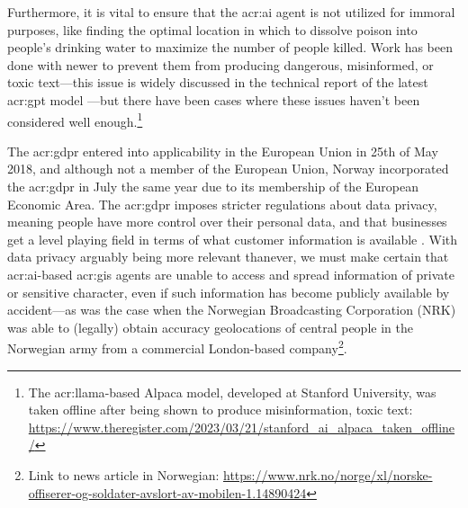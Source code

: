 Furthermore, it is vital to ensure that the \acrshort{acr:ai} agent is not utilized for immoral purposes, like finding the optimal location in which to dissolve poison into people's drinking water to maximize the number of people killed. Work has been done with newer  to prevent them from producing dangerous, misinformed, or toxic text---this issue is widely discussed in the technical report of the latest \acrshort{acr:gpt} model \citep[11-14]{openaiGPT4TechnicalReport2023}---but there have been cases where these issues haven't been considered well enough.\footnote{The \acrshort{acr:llama}-based Alpaca model, developed at Stanford University, was taken offline after being shown to produce misinformation, toxic text: \url{https://www.theregister.com/2023/03/21/stanford_ai_alpaca_taken_offline/}}

The \gls{acr:gdpr} entered into applicability in the European Union in 25th of May 2018, and although not a member of the European Union, Norway incorporated the \gls{acr:gdpr} in July the same year due to its membership of the European Economic Area. The \gls{acr:gdpr} imposes stricter regulations about data privacy, meaning people have more control over their personal data, and that businesses get a level playing field in terms of what customer information is available \citep{datatilsynetGeneralDataProtection}. With data privacy arguably being more relevant thanever, we must make certain that \acrshort{acr:ai}-based \acrshort{acr:gis} agents are unable to access and spread information of private or sensitive character, even if such information has become publicly available by accident---as was the case when the Norwegian Broadcasting Corporation (NRK) was able to (legally) obtain accuracy geolocations of central people in the Norwegian army from a commercial London-based company\footnote{Link to news article in Norwegian: \url{https://www.nrk.no/norge/xl/norske-offiserer-og-soldater-avslort-av-mobilen-1.14890424}}.

\glsresetall